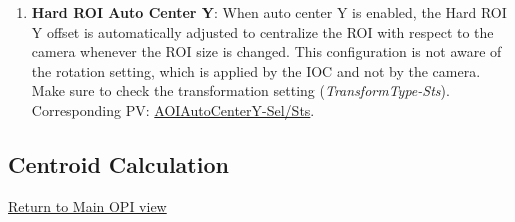 \documentclass[openany]{article}
\begin{document}
\begin{enumerate}
            \item \textbf{Hard ROI Auto Center Y}: When auto center Y is enabled, the Hard ROI Y offset is automatically adjusted to centralize the ROI with respect to the camera whenever the ROI size is changed. This configuration is not aware of the rotation setting, which is applied by the IOC and not by the camera. Make sure to check the transformation setting (\emph{TransformType-Sts}). Corresponding PV: \hyperlink{pv:hard-roi-auto-center-y}{AOIAutoCenterY-Sel/Sts}.
        \end{enumerate}

    \subsection{Centroid Calculation}\label{sec:centroid-calc}

        \hyperref[fig:opi-main]{Return to Main OPI view}
\end{document}
